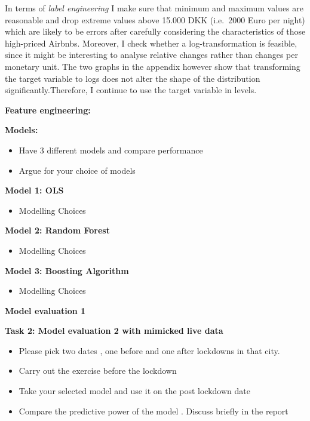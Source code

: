 \documentclass[
]{article}
\providecommand{\tightlist}{%
  \setlength{\itemsep}{0pt}\setlength{\parskip}{0pt}}
\begin{document}
In terms of \emph{label engineering} I make sure that minimum and
maximum values are reasonable and drop extreme values above 15.000 DKK
(i.e.~2000 Euro per night) which are likely to be errors after carefully
considering the characteristics of those high-priced Airbnbs. Moreover,
I check whether a log-transformation is feasible, since it might be
interesting to analyse relative changes rather than changes per monetary
unit. The two graphs in the appendix however show that transforming the
target variable to logs does not alter the shape of the distribution
significantly.Therefore, I continue to use the target variable in
levels.

\textbf{Feature engineering:}

\textbf{Models:}

\begin{itemize}
\tightlist
\item
  Have 3 different models and compare performance
\item
  Argue for your choice of models
\end{itemize}

\textbf{Model 1: OLS}

\begin{itemize}
\tightlist
\item
  Modelling Choices
\end{itemize}

\textbf{Model 2: Random Forest}

\begin{itemize}
\tightlist
\item
  Modelling Choices
\end{itemize}

\textbf{Model 3: Boosting Algorithm}

\begin{itemize}
\tightlist
\item
  Modelling Choices
\end{itemize}

\textbf{Model evaluation 1}

\textbf{Task 2: Model evaluation 2 with mimicked live data}

\begin{itemize}
\tightlist
\item
  Please pick two dates , one before and one after lockdowns in that
  city.
\item
  Carry out the exercise before the lockdown
\item
  Take your selected model and use it on the post lockdown date
\item
  Compare the predictive power of the model . Discuss briefly in the
  report
\end{itemize}
\end{document}
